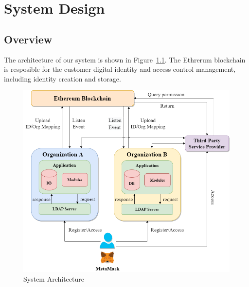 \chapter{System Design}
\label{chapter:design}

\section{Overview}
    The architecture of our system is shown in Figure~\ref{fig:system_architecture}. The Ethrerum blockchain is resposible for the customer digital identity and access control management, including identity creation and storage.
\begin{figure}[hb]
    \centering
    \includegraphics[height=!,width=1\linewidth,keepaspectratio=true]{figures/system_architecture.png}
    \caption{{\footnotesize System Architecture}}
    \label{fig:system_architecture}
\end{figure}

